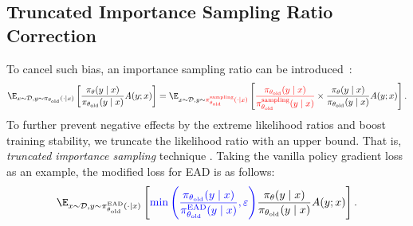 \subsection{Truncated Importance Sampling Ratio Correction}
\label{subsec:tis-correction}
To cancel such bias, an importance sampling ratio can be introduced~\citep{hilton2022batch,yao2025offpolicy}:
\begin{align*}
\E_{x \sim \mathcal{D},y{\sim} \mathbin{\pi_{\theta_{\text{old}}}(\cdot\mid x)}}\left[\frac{\pi_{\theta}(y\mid x)}{\pi_{\theta_{\text{old}}}(y\mid x)}A(y;x)\right]
=
\E_{x \sim \mathcal{D},y{\sim} \mathbin{\color{red}\pi^{\text{sampling}}_{\theta_{\text{old}}}(\cdot\mid x)}}
\left[{\color{red}\frac{\pi_{\theta_{\text{old}}}(y\mid x)}{\pi^{\text{sampling}}_{\theta_{\text{old}}}(y\mid x)}}\times\frac{\pi_{\theta}(y\mid x)}{\pi_{\theta_{\text{old}}}(y\mid x)}A(y;x)\right]. 
\end{align*}
To further prevent negative effects by the extreme likelihood ratios and boost training stability, we truncate the likelihood ratio with an upper bound. That is, \emph{truncated importance sampling} technique \citep{heckman1998matching}. Taking the vanilla policy gradient loss as an example, the modified loss for EAD is as follows:
\begin{equation*}
\label{eq:tis-pg}
\E_{x \sim \mathcal{D},y{\sim}{\pi^{\text{EAD}}_{\theta_{\text{old}}}(\cdot\mid x)}}
\left[{\color{blue}\min\left(\frac{\pi_{\theta_{\text{old}}}(y\mid x)}{\pi^{\text{EAD}}_{\theta_{\text{old}}}(y\mid x)},\varepsilon\right)}\frac{\pi_{\theta}(y\mid x)}{\pi_{\theta_{\text{old}}}(y\mid x)}A(y;x)\right].
\end{equation*}



